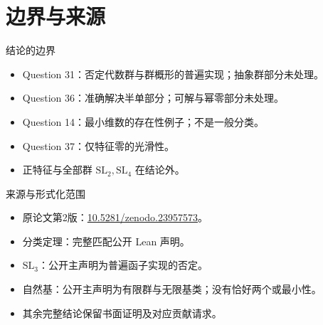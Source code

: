 \documentclass{beamer}
\begin{document}
\section{边界与来源}
\begin{frame}{结论的边界}
\begin{itemize}\item Question 31：否定代数群与群概形的普遍实现；抽象群部分未处理。\item Question 36：准确解决半单部分；可解与幂零部分未处理。\item Question 14：最小维数的存在性例子；不是一般分类。\item Question 37：仅特征零的光滑性。\item 正特征与全部群 $\mathrm{SL}_2,\mathrm{SL}_4$ 在结论外。\end{itemize}
\end{frame}
\begin{frame}{来源与形式化范围}
\begin{itemize}\item 原论文第2版：\href{https://doi.org/10.5281/zenodo.23957573}{10.5281/zenodo.23957573}。\item 分类定理：完整匹配公开 Lean 声明。\item $\mathrm{SL}_3$：公开主声明为普遍函子实现的否定。\item 自然基：公开主声明为有限群与无限基类；没有恰好两个或最小性。\item 其余完整结论保留书面证明及对应贡献请求。\end{itemize}
\end{frame}
\appendix
\end{document}

